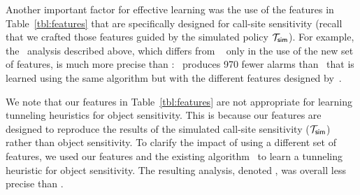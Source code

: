 Another important factor for effective learning was the use of the features in Table~\ref{tbl:features} that are specifically designed for call-site sensitivity (recall that we crafted those features guided by the simulated policy $\mathcal{T}_{{\sf sim}}$). 
For example, the \Existing~analysis described above, which differs from \onecallHT~\cite{JeJeOh18} only in the use of the new set of features, is much more precise than \onecallHT: \Existing~produces 970 fewer alarms than \onecallHT~that is learned using the same algorithm but with the different features designed by~\cite{JeJeOh18}. 



We note that our features in Table~\ref{tbl:features} are not appropriate for learning tunneling heuristics for object sensitivity. %
This is because our features are designed to reproduce the results of the simulated call-site sensitivity ($\mathcal{T}_{{\sf sim}}$) rather than object sensitivity. 
To clarify the impact of using a different set of features, we used our features and the existing algorithm~\cite{JeJeOh18} to learn a tunneling heuristic for object sensitivity.
The resulting analysis, denoted \oneobjHTnew, was overall less precise than \oneobjHT. 




